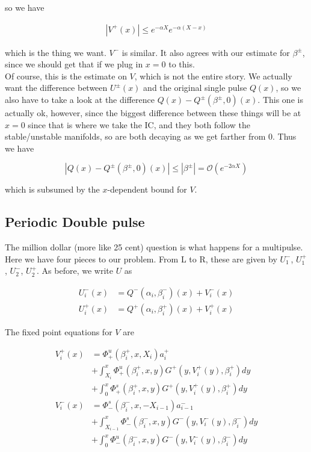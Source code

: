 \documentclass[12pt]{article}
\begin{document}
so we have 

\begin{align*}
|V^+(x)| \leq e^{-\alpha X} e^{-\alpha(X - x)}
\end{align*}

which is the thing we want. $V^-$ is similar. It also agrees with our estimate for $\beta^\pm$, since we should get that if we plug in $x = 0$ to this.\\

Of course, this is the estimate on $V$, which is not the entire story. We actually want the difference between $U^\pm(x)$ and the original single pulse $Q(x)$, so we also have to take a look at the difference $Q(x) - Q^\pm(\beta^\pm, 0)(x)$. This one is actually ok, however, since the biggest difference between these things will be at $x = 0$ since that is where we take the IC, and they both follow the stable/unstable manifolds, so are both decaying as we get farther from 0. Thus we have

\[
|Q(x) - Q^\pm(\beta^\pm, 0)(x)| \leq |\beta^\pm| = \mathcal{O}(e^{-2 \alpha X})
\]

which is subsumed by the $x$-dependent bound for $V$.\\

\subsection*{Periodic Double pulse}

The million dollar (more like 25 cent) question is what happens for a multipulse. Here we have four pieces to our problem. From L to R, these are given by
$U_1^-$, $U_1^+$, $U_2^-$, $U_2^+$. As before, we write $U$ as

\begin{align*}
U_i^-(x) &= Q^-(\alpha_i, \beta_i^-)(x) + V_i^-(x) \\
U_i^+(x) &= Q^+(\alpha_i, \beta_i^+)(x) + V_i^+(x)
\end{align*}

The fixed point equations for $V$ are

\begin{align*}
V_i^+(x) &= \Phi^u_+(\beta_i^+, x, X_i) a_i^+ \\
&+ \int_{X_i}^x \Phi_+^u(\beta_i^+, x, y) G^+(y, V_i^+(y),\beta_i^+)dy \\
&+ \int_0^x \Phi_+^s(\beta_i^+, x, y) G^+(y, V_i^+(y),\beta_i^+)dy \\ 
V_i^-(x) &= \Phi^s_-(\beta_i^-, x, -X_{i-1}) a_{i-1}^- \\
&+ \int_{X_{i-1}}^x \Phi_-^s(\beta_i^-, x, y) G^-(y, V_i^-(y),\beta_i^-)dy \\
&+ \int_0^x \Phi_-^u(\beta_i^-, x, y) G^-(y, V_i^-(y),\beta_i^-)dy \\
\end{align*}
\end{document}
